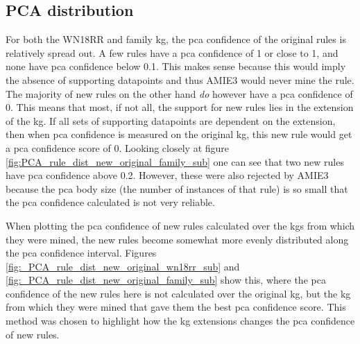 \subsection{PCA distribution}
For both the WN18RR and family \gls{kg}, the \gls{pca} confidence of the original rules is relatively spread out. A few rules have a \gls{pca} confidence of 1 or close to 1, and none have \gls{pca} confidence below 0.1. This makes sense because this would imply the absence of supporting datapoints and thus AMIE3 would never mine the rule. The majority of new rules on the other hand \textit{do} however have a \gls{pca} confidence of 0. This means that most, if not all, the support for new rules lies in the extension of the \gls{kg}. If all sets of supporting datapoints are dependent on the extension, then when \gls{pca} confidence is measured on the original \gls{kg}, this new rule would get a \gls{pca} confidence score of 0. Looking closely at figure \ref{fig:PCA_rule_dist_new_original_family_sub} one can see that two new rules have \gls{pca} confidence above 0.2. However, these were also rejected by AMIE3 because the \gls{pca} body size (the number of instances of that rule) is so small that the \gls{pca} confidence calculated is not very reliable.

When plotting the \gls{pca} confidence of new rules calculated over the \glspl{kg} from which they were mined, the new rules become somewhat more evenly distributed along the \gls{pca} confidence interval. Figures \ref{fig:_PCA_rule_dist_new_original_wn18rr_sub} and \ref{fig:_PCA_rule_dist_new_original_family_sub} show this, where the \gls{pca} confidence of the new rules here is not calculated over the original \gls{kg}, but the \gls{kg} from which they were mined that gave them the best \gls{pca} confidence score. This method was chosen to highlight how the \gls{kg} extensions changes the \gls{pca} confidence of new rules.


